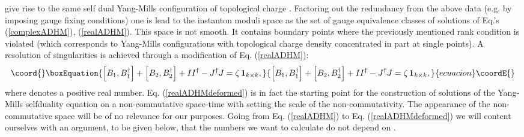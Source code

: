 \documentclass[a4paper,12pt]{article}
\begin{document}
give rise to the same self dual Yang-Mills configuration of
topological charge \coordHE{}. Factoring out the redundancy from the
above data (e.g. by imposing gauge fixing conditions) one is lead
to the instanton moduli space as the set of gauge equivalence
classes of solutions of Eq.'s (\ref{complexADHM}),
(\ref{realADHM}). This space is not smooth. It contains boundary
points where the previously mentioned rank condition is violated
(which corresponds to Yang-Mills configurations with topological
charge density concentrated in part at single points). A
resolution of singularities is achieved \cite{Nak} through a
modification of Eq. (\ref{realADHM}):
\begin{equation}\coord{}\boxEquation{
\label{realADHMdeformed} \left[ B_1, B_1^{\dagger}\right]+\left[ B_2,
B_2^{\dagger}\right]+II^{\dagger}-J^{\dagger}J=\zeta \, {\bf 1}_{k \times k},
}{
\left[ B_1, B_1^{\dagger}\right]+\left[ B_2,
B_2^{\dagger}\right]+II^{\dagger}-J^{\dagger}J=\zeta \, {\bf 1}_{k \times k},
}{ecuacion}\coordE{}\end{equation}
where \myHighlight{$\zeta$}\coordHE{} denotes a positive real number. Eq.
(\ref{realADHMdeformed}) is in fact the starting point for the
construction of solutions of the Yang-Mills selfduality  equation
on a non-commutative space-time \cite{NSch} with \myHighlight{$\zeta$}\coordHE{} setting
the scale of the non-commutativity. The appearance of the
non-commutative space will be of no relevance for our purposes.
Going from Eq. (\ref{realADHM}) to Eq. (\ref{realADHMdeformed}) we
will content ourselves with an argument, to be given below, that
the numbers we want to calculate do not depend on \myHighlight{$\zeta$}\coordHE{}.
\end{document}
